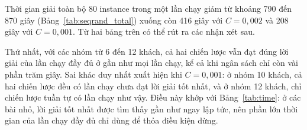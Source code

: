 \documentclass[../DoAn.tex]{subfiles}
\begin{document}
\begin{table}[H]
\centering
\caption{So sánh hai chiến lược với ngân sách thời gian $T_{\text{lim}} = 0{,}001\,n^2$ giây}
\label{tab:tlim1}
\end{table}

Thời gian giải toàn bộ 80 instance trong một lần chạy giảm từ khoảng 790 đến 870 giây (Bảng~\ref{tab:seqrand_total}) xuống còn 416 giây với $C = 0{,}002$ và 208 giây với $C = 0{,}001$. Từ hai bảng trên có thể rút ra các nhận xét sau.

Thứ nhất, với các nhóm từ 6 đến 12 khách, cả hai chiến lược vẫn đạt đúng lời giải của lần chạy đầy đủ ở gần như mọi lần chạy, kể cả khi ngân sách chỉ còn vài phần trăm giây. Sai khác duy nhất xuất hiện khi $C = 0{,}001$: ở nhóm 10 khách, cả hai chiến lược đều có lần chạy chưa đạt lời giải tốt nhất, và ở nhóm 12 khách, chỉ chiến lược tuần tự có lần chạy như vậy. Điều này khớp với Bảng~\ref{tab:time}: ở các bài nhỏ, lời giải tốt nhất được tìm thấy gần như ngay lập tức, nên phần lớn thời gian của lần chạy đầy đủ chỉ dùng để thỏa điều kiện dừng.
\end{document}
